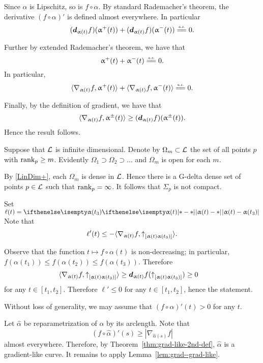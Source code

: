 
Since $\alpha$ is Lipschitz, so is $f\circ\alpha$.
By standard Rademacher's theorem, the derivative $(f\circ\alpha)'$ is defined almost everywhere.
In particular 
\[(\dd_{\alpha(t)}f)(\alpha^+(t))+(\dd_{\alpha(t)}f)(\alpha^-(t))\ae0.\]

Further by extended Rademacher's theorem, %
we have that
\[\alpha^+(t)+\alpha^-(t)\ae0.\]
In particular,
\[\<\nabla_{\alpha(t)}f,\alpha^+(t)\>+\<\nabla_{\alpha(t)}f,\alpha^-(t)\>
\ae0.\]

Finally, by the definition of gradient, we have that 
\[\<\nabla_{\alpha(t)}f,\alpha^\pm(t)\>\ge (\dd_{\alpha(t)}f)(\alpha^\pm(t)).\]
Hence the result follows.


Suppose that $\mathcal{L}$ is infinite dimensional.
Denote by $\Omega_m\subset \spc{L}$ the set of all points $p$ with $\rank_p\ge m$.
Evidently $\Omega_1\supset \Omega_2\supset\dots$ and $\Omega_m$ is open for each $m$.

By \ref{LinDim+}, each $\Omega_m$ is dense in $\mathcal{L}$.
Hence there is a G-delta dense set of points $p\in\spc{L}$ such that $\mathop{\rm rank}\nolimits_p=\infty$.
It follows that $\Sigma_p$ is not compact.


Set $\ell(t)=\dist{\alpha(t)}{\alpha(t_3)}{}$
Note that 
\[\ell'(t)\le -\langle \nabla_{\alpha(t)}f,\dir{\alpha(t)}{\alpha(t_3)}\rangle.\]

Observe that the function $t\mapsto f\circ\alpha(t)$ is non-decreasing;
in particular, $f(\alpha(t_1))\le f(\alpha(t_2))\le f(\alpha(t_3))$.
Therefore 
\begin{align*}\langle \nabla_{\alpha(t)}f,\dir{\alpha(t)}{\alpha(t_3)}\rangle&\ge\dd_{\alpha(t)}f(\dir{\alpha(t)}{\alpha(t_3)})\ge 0
\end{align*}
for any $t\in[t_1,t_2]$.
Therefore $\ell'\le 0$ for any $t\in[t_1,t_2]$, hence the statement.

Without loss of generality, we may assume that $(f\circ\alpha)'(t)>0$ for any $t$.

Let $\hat\alpha$ be reparametrization of $\alpha$ by its arclength.
Note that 
\[(f\circ\hat\alpha)'(s)\ge |\nabla_{\hat\alpha(s)}f|\]
almost everywhere.
Therefore, by Theorem~\ref{thm:grad-like-2nd-def}, $\hat\alpha$ is a gradient-like curve.
It remains to apply Lemma~\ref{lem:grad--grad-like}.

